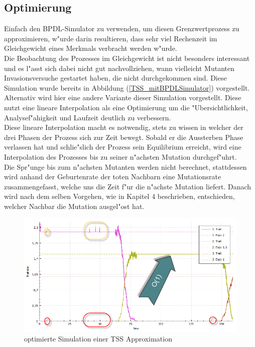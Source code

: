 \documentclass[11pt, a4paper, german]{article}
\theoremstyle{plain}
\begin{document}
	\subsection{Optimierung}
	Einfach den BPDL-Simulator zu verwenden, um diesen Grenzwertprozess zu approximieren, w"urde darin resultieren, dass sehr viel Rechenzeit im Gleichgewicht eines Merkmals verbracht werden w"urde.\\
	Die Beobachtung des Prozesses im Gleichgewicht ist nicht besonders interessant und es l"asst sich dabei nicht gut nachvollziehen, wann vielleicht Mutanten Invasionsversuche gestartet haben, die nicht durchgekommen sind. Diese Simulation wurde bereits in Abbildung (\ref{TSS_mitBPDLSimulator}) vorgestellt.\\
	Alternativ wird hier eine andere Variante dieser Simulation vorgestellt. 
	Diese nutzt eine lineare Interpolation als eine Optimierung um die "Ubersichtlichkeit, Analysef"ahigkeit und Laufzeit deutlich zu verbessern.\\
	Diese lineare Interpolation macht es notwendig, stets zu wissen in welcher der drei Phasen der Prozess sich zur Zeit bewegt. Sobald er die Aussterben Phase verlassen hat und schlie"slich der Prozess sein Equilibrium erreicht, wird eine Interpolation des Prozesses bis zu seiner n"achsten Mutation durchgef"uhrt.\\
	Die Spr"unge bis zum n"achsten Mutanten werden nicht berechnet, stattdessen wird anhand der Geburtenrate der toten Nachbarn eine Mutationsrate zusammengefasst, welche uns die Zeit f"ur die n"achste Mutation liefert. Danach wird nach dem selben Vorgehen, wie in Kapitel 4 beschrieben, entschieden, welcher Nachbar die Mutation ausgel"ost hat.\\
	\begin{figure}[H]
		\centering
		\includegraphics[width=1\linewidth]{./Pictures/TSS2_optimierung_small}
		\caption[MainWindow_redGreenFitness]{optimierte Simulation einer TSS Approximation}
		\label{TSS2_optimierung_small}
	\end{figure}
\end{document}
